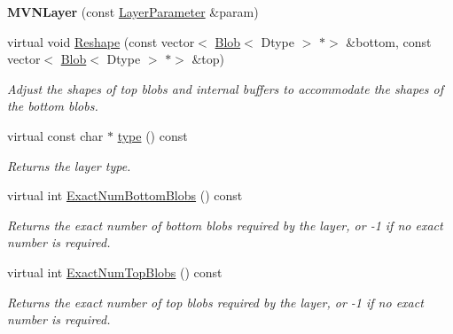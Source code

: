 \begin{DoxyCompactItemize}
\mbox{\label{classcaffe_1_1_m_v_n_layer_aebec689ed713a68664980b03454e3506}} 
{\bfseries M\+V\+N\+Layer} (const \mbox{\hyperlink{classcaffe_1_1_layer_parameter}{Layer\+Parameter}} \&param)
\item 
virtual void \mbox{\hyperlink{classcaffe_1_1_m_v_n_layer_afcb6c5f28b45496eed1b0ea19705b763}{Reshape}} (const vector$<$ \mbox{\hyperlink{classcaffe_1_1_blob}{Blob}}$<$ Dtype $>$ $\ast$$>$ \&bottom, const vector$<$ \mbox{\hyperlink{classcaffe_1_1_blob}{Blob}}$<$ Dtype $>$ $\ast$$>$ \&top)
\begin{DoxyCompactList}\small\item\em Adjust the shapes of top blobs and internal buffers to accommodate the shapes of the bottom blobs. \end{DoxyCompactList}\item 
\mbox{\label{classcaffe_1_1_m_v_n_layer_af32c09dc68d5a12dd2111ff07b373e8a}} 
virtual const char $\ast$ \mbox{\hyperlink{classcaffe_1_1_m_v_n_layer_af32c09dc68d5a12dd2111ff07b373e8a}{type}} () const
\begin{DoxyCompactList}\small\item\em Returns the layer type. \end{DoxyCompactList}\item 
virtual int \mbox{\hyperlink{classcaffe_1_1_m_v_n_layer_afd9b078a1bb48de9b91f3766edbbf058}{Exact\+Num\+Bottom\+Blobs}} () const
\begin{DoxyCompactList}\small\item\em Returns the exact number of bottom blobs required by the layer, or -\/1 if no exact number is required. \end{DoxyCompactList}\item 
virtual int \mbox{\hyperlink{classcaffe_1_1_m_v_n_layer_ae10d9ef135adf3cd25e86ce06188c814}{Exact\+Num\+Top\+Blobs}} () const
\begin{DoxyCompactList}\small\item\em Returns the exact number of top blobs required by the layer, or -\/1 if no exact number is required. \end{DoxyCompactList}\end{DoxyCompactItemize}
